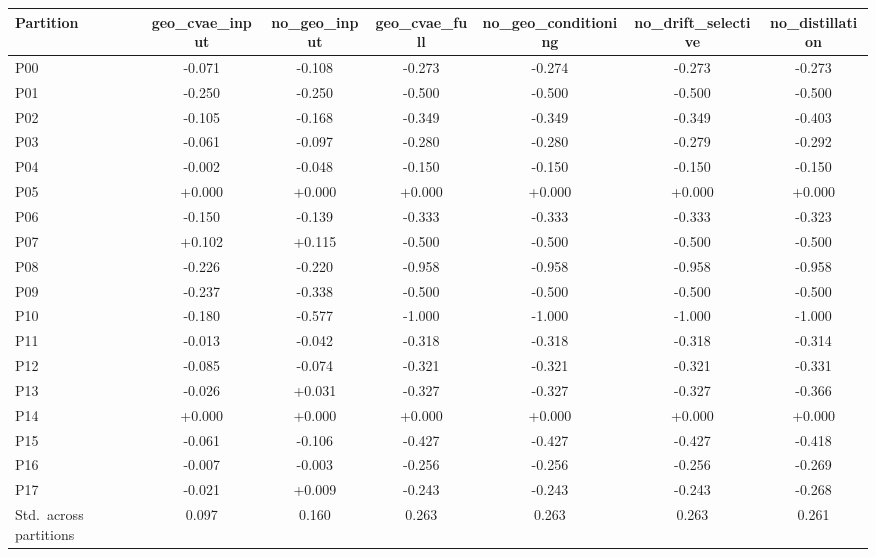 \begin{tabular}{lcccccc}
\toprule
\textbf{Partition} & \textbf{geo_cvae_input} & \textbf{no_geo_input} & \textbf{geo_cvae_full} & \textbf{no_geo_conditioning} & \textbf{no_drift_selective} & \textbf{no_distillation} \\
\midrule
P00 & -0.071 & -0.108 & -0.273 & -0.274 & -0.273 & -0.273 \\
P01 & -0.250 & -0.250 & -0.500 & -0.500 & -0.500 & -0.500 \\
P02 & -0.105 & -0.168 & -0.349 & -0.349 & -0.349 & -0.403 \\
P03 & -0.061 & -0.097 & -0.280 & -0.280 & -0.279 & -0.292 \\
P04 & -0.002 & -0.048 & -0.150 & -0.150 & -0.150 & -0.150 \\
P05 & +0.000 & +0.000 & +0.000 & +0.000 & +0.000 & +0.000 \\
P06 & -0.150 & -0.139 & -0.333 & -0.333 & -0.333 & -0.323 \\
P07 & +0.102 & +0.115 & -0.500 & -0.500 & -0.500 & -0.500 \\
P08 & -0.226 & -0.220 & -0.958 & -0.958 & -0.958 & -0.958 \\
P09 & -0.237 & -0.338 & -0.500 & -0.500 & -0.500 & -0.500 \\
P10 & -0.180 & -0.577 & -1.000 & -1.000 & -1.000 & -1.000 \\
P11 & -0.013 & -0.042 & -0.318 & -0.318 & -0.318 & -0.314 \\
P12 & -0.085 & -0.074 & -0.321 & -0.321 & -0.321 & -0.331 \\
P13 & -0.026 & +0.031 & -0.327 & -0.327 & -0.327 & -0.366 \\
P14 & +0.000 & +0.000 & +0.000 & +0.000 & +0.000 & +0.000 \\
P15 & -0.061 & -0.106 & -0.427 & -0.427 & -0.427 & -0.418 \\
P16 & -0.007 & -0.003 & -0.256 & -0.256 & -0.256 & -0.269 \\
P17 & -0.021 & +0.009 & -0.243 & -0.243 & -0.243 & -0.268 \\
\midrule
Std.\ across partitions & 0.097 & 0.160 & 0.263 & 0.263 & 0.263 & 0.261 \\
\bottomrule
\end{tabular}